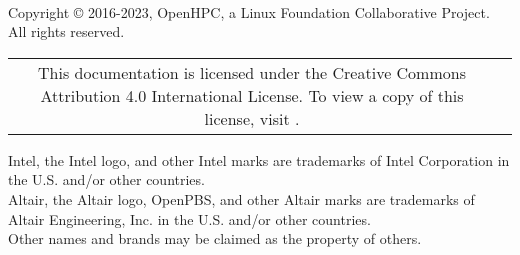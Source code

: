 \newpage

\vspace*{3.0cm}
 \\ 

\vspace*{0.5cm}

\noindent Copyright {\small\copyright} 2016-2023, OpenHPC, a Linux Foundation
Collaborative Project. All rights reserved. \\

\vspace*{0.1cm}

\noindent \begin{tabular}{cp{10cm}}
This documentation is licensed under the Creative Commons Attribution 4.0 International
License. To view a copy of this license, visit
\href{http://creativecommons.org/licenses/by/4.0}{\color{blue}{http://creativecommons.org/licenses/by/4.0}}. \\
\end{tabular}


\vspace*{1.5cm}

{\footnotesize

\noindent Intel, the Intel logo, and other Intel marks are trademarks of Intel
Corporation in the U.S. and/or other countries. \\
\noindent Altair, the Altair logo, OpenPBS, and other Altair marks are
trademarks of Altair Engineering, Inc. in the U.S. and/or other countries. \\
\fi
\noindent *Other names and brands may be claimed as the property of others. \\



}
